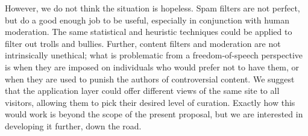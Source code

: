 \documentclass[oneside]{zarticle}
\begin{document}
However, we do not think the situation is hopeless.  Spam filters are
not perfect, but do a good enough job to be useful, especially in
conjunction with human moderation.  The same statistical and heuristic
techniques could be applied to filter out trolls and bullies.
Further, content filters and moderation are not intrinsically
unethical; what is problematic from a freedom-of-speech perspective is
when they are imposed on individuals who would prefer not to have
them, or when they are used to punish the authors of controversial
content.  We suggest that the application layer could offer different
views of the same site to all visitors, allowing them to pick their
desired level of curation.  Exactly how this would work is beyond the
scope of the present proposal, but we are interested in developing it
further, down the road.

\clearpage
\singlespacing
\printbibliography
\end{document}
